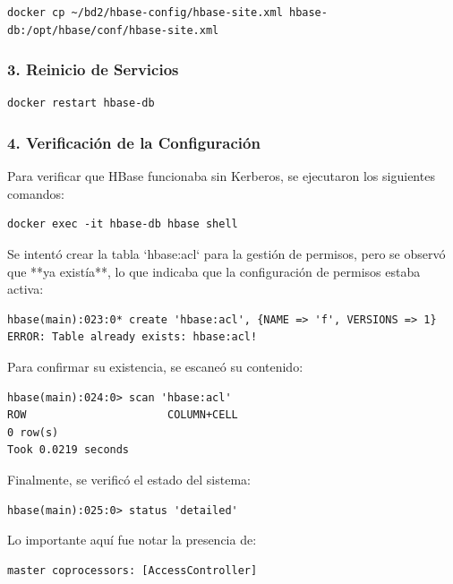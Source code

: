 \documentclass{article}
\begin{document}
\begin{lstlisting}[style=bashStyle]
docker cp ~/bd2/hbase-config/hbase-site.xml hbase-db:/opt/hbase/conf/hbase-site.xml
\end{lstlisting}


\subsubsection{3. Reinicio de Servicios}

\begin{lstlisting}[style=bashStyle]
docker restart hbase-db
\end{lstlisting}


\subsubsection{4. Verificación de la Configuración}

Para verificar que HBase funcionaba sin Kerberos, se ejecutaron los siguientes comandos:

\begin{lstlisting}[style=bashStyle]
docker exec -it hbase-db hbase shell
\end{lstlisting}

Se intentó crear la tabla `hbase:acl` para la gestión de permisos, pero se observó que **ya existía**, lo que indicaba que la configuración de permisos estaba activa:

\begin{lstlisting}[style=bashStyle]
hbase(main):023:0* create 'hbase:acl', {NAME => 'f', VERSIONS => 1}
ERROR: Table already exists: hbase:acl!
\end{lstlisting}

Para confirmar su existencia, se escaneó su contenido:

\begin{lstlisting}[style=bashStyle]
hbase(main):024:0> scan 'hbase:acl'
ROW                      COLUMN+CELL
0 row(s)
Took 0.0219 seconds
\end{lstlisting}

Finalmente, se verificó el estado del sistema:

\begin{lstlisting}[style=bashStyle]
hbase(main):025:0> status 'detailed'
\end{lstlisting}

Lo importante aquí fue notar la presencia de:

\begin{verbatim}
master coprocessors: [AccessController]
\end{verbatim}
\end{document}
